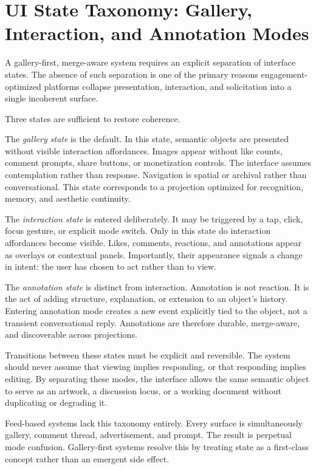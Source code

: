 \documentclass[11pt,oneside]{article}
\begin{document}
\section{UI State Taxonomy: Gallery, Interaction, and Annotation Modes}

A gallery-first, merge-aware system requires an explicit separation of interface states. The absence of such separation is one of the primary reasons engagement-optimized platforms collapse presentation, interaction, and solicitation into a single incoherent surface.

Three states are sufficient to restore coherence.

The \emph{gallery state} is the default. In this state, semantic objects are presented without visible interaction affordances. Images appear without like counts, comment prompts, share buttons, or monetization controls. The interface assumes contemplation rather than response. Navigation is spatial or archival rather than conversational. This state corresponds to a projection optimized for recognition, memory, and aesthetic continuity.

The \emph{interaction state} is entered deliberately. It may be triggered by a tap, click, focus gesture, or explicit mode switch. Only in this state do interaction affordances become visible. Likes, comments, reactions, and annotations appear as overlays or contextual panels. Importantly, their appearance signals a change in intent: the user has chosen to act rather than to view.

The \emph{annotation state} is distinct from interaction. Annotation is not reaction. It is the act of adding structure, explanation, or extension to an object’s history. Entering annotation mode creates a new event explicitly tied to the object, not a transient conversational reply. Annotations are therefore durable, merge-aware, and discoverable across projections.

Transitions between these states must be explicit and reversible. The system should never assume that viewing implies responding, or that responding implies editing. By separating these modes, the interface allows the same semantic object to serve as an artwork, a discussion locus, or a working document without duplicating or degrading it.

Feed-based systems lack this taxonomy entirely. Every surface is simultaneously gallery, comment thread, advertisement, and prompt. The result is perpetual mode confusion. Gallery-first systems resolve this by treating state as a first-class concept rather than an emergent side effect.
\end{document}
